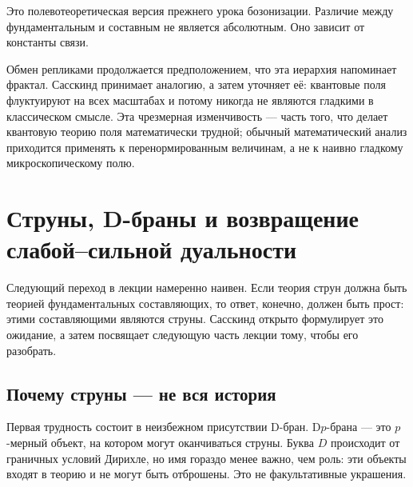 Это полевотеоретическая версия прежнего урока бозонизации. Различие между фундаментальным и составным не является абсолютным. Оно зависит от константы связи.

\begin{classroomqa}
\end{classroomqa}

Обмен репликами продолжается предположением, что эта иерархия напоминает фрактал. Сасскинд принимает аналогию, а затем уточняет её: квантовые поля флуктуируют на всех масштабах и потому никогда не являются гладкими в классическом смысле. Эта чрезмерная изменчивость — часть того, что делает квантовую теорию поля математически трудной; обычный математический анализ приходится применять к перенормированным величинам, а не к наивно гладкому микроскопическому полю.

\section{Струны, D-браны и возвращение слабой--сильной дуальности}

Следующий переход в лекции намеренно наивен. Если теория струн должна быть теорией фундаментальных составляющих, то ответ, конечно, должен быть прост: этими составляющими являются струны. Сасскинд открыто формулирует это ожидание, а затем посвящает следующую часть лекции тому, чтобы его разобрать.

\subsection{Почему струны — не вся история}

Первая трудность состоит в неизбежном присутствии D-бран. D\(p\)-брана — это \(p\)-мерный объект, на котором могут оканчиваться струны. Буква \(D\) происходит от граничных условий Дирихле, но имя гораздо менее важно, чем роль: эти объекты входят в теорию и не могут быть отброшены. Это не факультативные украшения.

